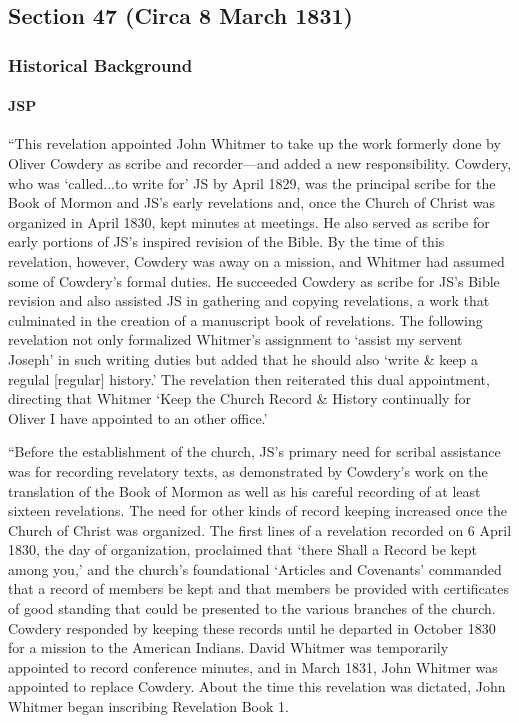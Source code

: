 \subsection{Section 47 (Circa 8 March 1831)}
	\label{DC47}
	
	\subsubsection{Historical Background}
		\label{DC47-HB}
		
		\paragraph{JSP}
		
			``This revelation appointed John Whitmer to take up the work formerly done by Oliver Cowdery as scribe and recorder---and added a new responsibility. Cowdery, who was `called...to write for' JS by April 1829, was the principal scribe for the Book of Mormon and JS's early revelations and, once the Church of Christ was organized in April 1830, kept minutes at meetings. He also served as scribe for early portions of JS's inspired revision of the Bible. By the time of this revelation, however, Cowdery was away on a mission, and Whitmer had assumed some of Cowdery's formal duties. He succeeded Cowdery as scribe for JS's Bible revision and also assisted JS in gathering and copying revelations, a work that culminated in the creation of a manuscript book of revelations. The following revelation not only formalized Whitmer's assignment to `assist my servent Joseph' in such writing duties but added that he should also `write \& keep a regulal [regular] history.' The revelation then reiterated this dual appointment, directing that Whitmer `Keep the Church Record \& History continually for Oliver I have appointed to an other office.'
			
			``Before the establishment of the church, JS's primary need for scribal assistance was for recording revelatory texts, as demonstrated by Cowdery's work on the translation of the Book of Mormon as well as his careful recording of at least sixteen revelations. The need for other kinds of record keeping increased once the Church of Christ was organized. The first lines of a revelation recorded on 6 April 1830, the day of organization, proclaimed that `there Shall a Record be kept among you,' and the church's foundational `Articles and Covenants' commanded that a record of members be kept and that members be provided with certificates of good standing that could be presented to the various branches of the church. Cowdery responded by keeping these records until he departed in October 1830 for a mission to the American Indians. David Whitmer was temporarily appointed to record conference minutes, and in March 1831, John Whitmer was appointed to replace Cowdery. About the time this revelation was dictated, John Whitmer began inscribing Revelation Book 1.
			
